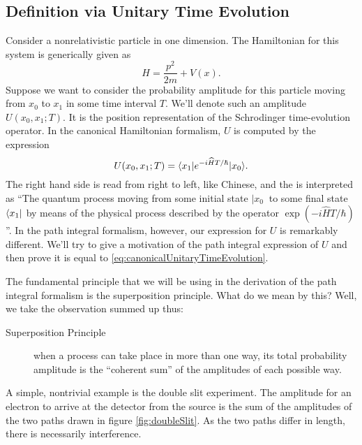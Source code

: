 
\subsection{Definition via Unitary Time Evolution}
Consider a nonrelativistic particle in one dimension. The
Hamiltonian for this system is generically given as
\begin{equation}%
H = \frac{p^{2}}{2m} + V(x).
\end{equation}
Suppose we want to consider the probability amplitude for this
particle moving from $x_0$ to $x_1$ in some time interval
$T$. We'll denote such an amplitude $U(x_0,x_1;T)$. It is the
position representation of the Schrodinger time-evolution
operator. In the canonical Hamiltonian formalism, $U$ is computed
by the expression
\begin{equation}\label{eq:canonicalUnitaryTimeEvolution}
U(x_0,x_1;T) = \langle x_1|e^{-i\widehat{H}T/\hbar}|x_0\rangle.
\end{equation}
The right hand side is read from right to left, like Chinese, and
the is interpreted as ``The quantum process moving from some
initial state $|x_0\>$ to some final state $\langle x_1|$ by means of
the physical process described by the operator
$\exp(-i\hat{H}T/\hbar)$''. In the path integral formalism,
however, our expression for $U$ is remarkably different. We'll
try to give a motivation of the path integral expression of $U$
and then prove it is equal to \eqref{eq:canonicalUnitaryTimeEvolution}.

The fundamental principle that we will be using in the derivation
of the path integral formalism is the superposition
principle. What do we mean by this? Well, we take the observation
summed up thus:
\begin{description}
\item[Superposition Principle] when a process can take place in
  more than one way, its total probability amplitude is the
  ``coherent sum'' of the amplitudes of each possible way.
\end{description}
A simple, nontrivial example is the double slit experiment. The
amplitude for an electron to arrive at the detector from the
source is the sum of the amplitudes of the two paths drawn in
figure \eqref{fig:doubleSlit}. As the two paths differ in length,
there is necessarily interference.


